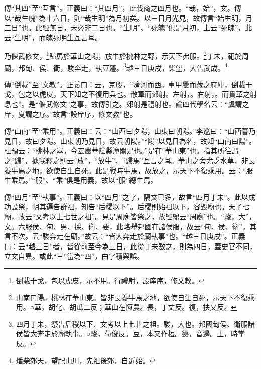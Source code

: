 {\noindent\zhuan{}\fzbyks 傳“其四”至“互言”。正義曰：“其四月”，此伐商之四月也。“哉，始”，文。傳以“哉生魄”為十六日，則“哉生明”為月初矣。以三日月光見，故傳言“始生明，月三日”也。此經無日，未必非二日也。“生明”、“死魄”俱是月初，上云“死魄”，此云“生明”，而魄死明生互言耳。 \par}

乃偃武修文，\footnote{倒載干戈，包以虎皮，示不用。行禮射，設庠序，修文教。}歸馬於華山之陽，放牛於桃林之野，示天下弗服。\footnote{山南曰陽。桃林在華山東。皆非長養牛馬之地，欲使自生自死，示天下不復乘用。○華，胡化、胡瓜二反；華山在恆農。長，丁丈反。復，扶又反。}丁未，祀於周廟，邦甸、侯、衛，駿奔走，執豆籩。\footnote{四月丁未，祭告后稷以下、文考以上七世之祖。駿，大也。邦國甸侯、衛服諸侯皆大奔走於廟執事。○駿，荀俊反。豆，本又作梪。籩，音邊。上，時掌反。}越三日庚戌，柴望，大告武成。\footnote{燔柴郊天，望祀山川，先祖後郊，自近始。}

{\noindent\zhuan{}\fzbyks 傳“倒載”至“文教”。正義曰：云，克殷，“濟河而西。車甲釁而藏之府庫，倒載干戈，包之以虎皮，天下知之不復用兵也。散軍而郊射。左射，。右射，。而貫革之射息也”。是“偃武修文”之事，故傳引之。郊射是禮射也。論四代學名云：“虞謂之庠，夏謂之序。”故言“設庠序，修文教”也。 \par}

{\noindent\zhuan{}\fzbyks 傳“山南”至“乘用”。正義曰：云：“山西曰夕陽，山東曰朝陽。”李巡曰：“山西暮乃見日，故曰夕陽。山東朝乃見日，故云朝陽。”“陽”以見日為名，故知“山南曰陽”。杜預云：“桃林之塞，今宏農華陰縣潼關是也。”是在“華山東”也。指其所往謂之“歸”，據我釋之則云“放”，“放牛”、“歸馬”互言之耳。華山之旁尤乏水草，非長養牛馬之地，欲使自生自死。此是戰時牛馬，故放之，示天下不復乘用。云：“服牛乘馬。”“服”、“乘”俱是用義，故以“服”總牛馬。 \par}

{\noindent\zhuan{}\fzbyks 傳“四月”至“執事”。正義曰：以“四月”之字，隔文已多，故言“四月丁未”。此以成功設祭，明其遍告群祖，知告“后稷以下”。后稷則始祖以下，容毀廟也。天子七廟，故云“文考以上七世之祖”。見是周廟皆祭之，故經總云“周廟”也。“駿，大”，文。六服侯、甸、男、採、衛、要，此略舉邦國在諸侯服，故云“甸、侯、衛”，其言不次。云“駿奔走在廟。”故云：“皆大奔走於廟執事”也。“越三日庚戌”。正義曰：云“越三日”者，皆從前至今為三日，此從丁未數之，則為四日，蓋史官不同，立文自異。或此“三”當為“四”，由字積與誤。 \par}

